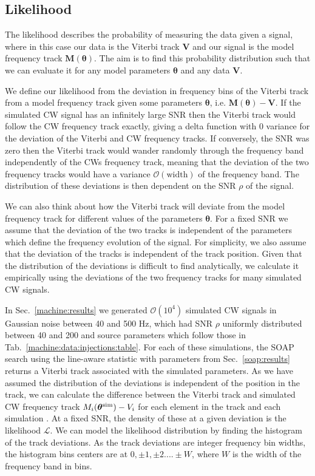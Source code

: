 %
%
\subsection{\label{par_est:bayes:likelihood}Likelihood}
%
%

The likelihood describes the probability of measuring the data
given a signal, where in this case our data is the Viterbi track $\bm{V}$ and
our signal is the model frequency track $\bm{M}(\bm{\theta})$.  The aim is to
find this probability distribution such that we can evaluate it for any model
parameters $\bm{\theta}$ and any data $\bm{V}$.

We define our likelihood from the deviation in frequency bins of the Viterbi
track from a model frequency track given some parameters $\bm{\theta}$, i.e.
$\bm{M}(\bm{\theta}) - \bm{V}$.  If the simulated \gls{CW} signal has an
infinitely large \gls{SNR} then the Viterbi track would follow the \gls{CW}
frequency track exactly, giving a delta function with 0 variance for the
deviation of the Viterbi and \gls{CW} frequency tracks. If conversely, the \gls{SNR} was zero
then the Viterbi track would wander randomly through the frequency band
independently of the \glspl{CW} frequency track, meaning that the deviation of
the two frequency tracks would have a variance $\mathcal{O}(\text{width})$ of the
frequency band.  The distribution of these deviations is then dependent on the
\gls{SNR} $\rho$ of the signal.  

We can also think about how the Viterbi track will deviate from the model frequency track for different values of the parameters $\bm{\theta}$.
For a fixed \gls{SNR} we assume that the deviation of the two tracks is independent of the parameters which define the frequency evolution of the signal. 
For simplicity, we also assume that the deviation of the tracks is independent of the track position.
Given that the distribution of the deviations is difficult to find analytically, we calculate it empirically using the deviations of the two frequency tracks for many simulated \gls{CW} signals. 

In Sec.~\ref{machine:results} we generated $\mathcal{O}(10^{4})$ simulated
\gls{CW} signals in Gaussian noise between 40 and 500 Hz, which had \gls{SNR}
$\rho$ uniformly distributed between 40 and 200 and
source parameters which follow those in
Tab.~\ref{machine:data:injections:table}. For each of these simulations, the
SOAP search using the line-aware statistic with parameters from
Sec.~\ref{soap:results} returns a Viterbi track associated with the simulated
parameters.  As we have assumed the distribution of the deviations is independent of the position in the track, we can calculate the difference between the Viterbi track and simulated \gls{CW} frequency track $M_i(\bm{\theta}^{\rm{sim}}) - V_i$ for each
element in the track and each simulation .
At a fixed \gls{SNR}, the density of these at a given deviation is the likelihood $\mathcal{L}$. 
We can model the likelihood distribution by finding the histogram of the track deviations.  As the track deviations are
integer frequency bin widths, the histogram bins centers are at $0, \pm 1, \pm 2 .... \pm W$, where $W$ is the width of the frequency band
in bins.


